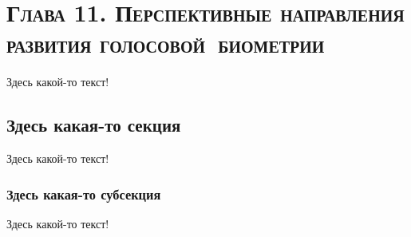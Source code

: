 \documentclass[12pt]{book}
\begin{document}
\chapter*{\textsc{Глава 11. Перспективные направления развития голосовой~биометрии}}

\thispagestyle{fancy}

\large{Здесь какой-то текст!}

\section{Здесь какая-то секция}

\large{Здесь какой-то текст!}

\subsection{Здесь какая-то субсекция}

\large{Здесь какой-то текст!}
\end{document}
